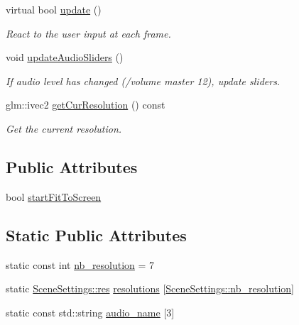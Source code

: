 \begin{DoxyCompactItemize}
\mbox{\label{class_scene_settings_ac32c443d620d0417b301193e87885a91}} 
virtual bool \hyperlink{class_scene_settings_ac32c443d620d0417b301193e87885a91}{update} ()
\begin{DoxyCompactList}\small\item\em React to the user input at each frame. \end{DoxyCompactList}\item 
\mbox{\label{class_scene_settings_a7f7903e9d7b6c33c9e4472c583d97710}} 
void \hyperlink{class_scene_settings_a7f7903e9d7b6c33c9e4472c583d97710}{update\+Audio\+Sliders} ()
\begin{DoxyCompactList}\small\item\em If audio level has changed (/volume master 12), update sliders. \end{DoxyCompactList}\item 
glm\+::ivec2 \hyperlink{class_scene_settings_a590dc1227ae74a8af7a3f3cb0ccc45fd}{get\+Cur\+Resolution} () const
\begin{DoxyCompactList}\small\item\em Get the current resolution. \end{DoxyCompactList}\end{DoxyCompactItemize}
\subsection*{Public Attributes}
\begin{DoxyCompactItemize}
\item 
bool \hyperlink{class_scene_settings_a39e0fde5848e50be67df1669b83ae384}{start\+Fit\+To\+Screen}
\end{DoxyCompactItemize}
\subsection*{Static Public Attributes}
\begin{DoxyCompactItemize}
\item 
static const int \hyperlink{class_scene_settings_a1562222a4d6383d813923504a0818807}{nb\+\_\+resolution} = 7
\item 
static \hyperlink{struct_scene_settings_1_1res}{Scene\+Settings\+::res} \hyperlink{class_scene_settings_a2a438f29929e98bc99953b5afc879602}{resolutions} \mbox{[}\hyperlink{class_scene_settings_a1562222a4d6383d813923504a0818807}{Scene\+Settings\+::nb\+\_\+resolution}\mbox{]}
\item 
static const std\+::string \hyperlink{class_scene_settings_a06afc9f52a21fc03e3b6823bcecefdd3}{audio\+\_\+name} \mbox{[}3\mbox{]}
\end{DoxyCompactItemize}
